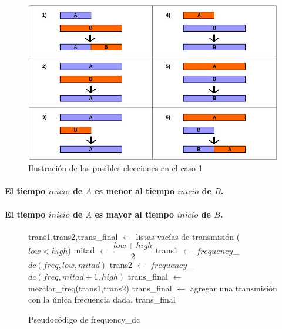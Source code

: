 \begin{figure}[htb]
  \begin{center}
      \includegraphics[scale=0.5]{imagenes/casosiiguales.jpeg}
  \end{center}
  \caption{Ilustración de las posibles elecciones en el caso 1}\label{fig:caso1}
\end{figure}

\paragraph{El tiempo $inicio$ de $A$ es menor al tiempo $inicio$ de $B$.}

\paragraph{El tiempo $inicio$ de $A$ es mayor al tiempo $inicio$ de $B$.}


\begin{figure}[!ht]
\begin{codebox}
\li trans1,trans2,trans_final $\leftarrow$ listas vacías de transmisión
\li \If ($low < high$)
\li		\Then 
			mitad $\leftarrow$ $\dfrac{low + high}{2}$
\li			trans1 $\leftarrow$ $frequency$_$dc(freq,low,mitad)$
\li			trans2 $\leftarrow$ $frequency$_$dc(freq,mitad+1,high)$
\li			trans_final $\leftarrow$ {\sc mezclar_freq}(trans1,trans2)
\li 		\Else
			trans_final $\leftarrow$ agregar una transmisión con la única frecuencia dada.
		\End
\li \Return trans_final 
 \end{codebox}
\caption{Pseudocódigo de frequency_dc}\label{code:freq_dc}
\end{figure}

